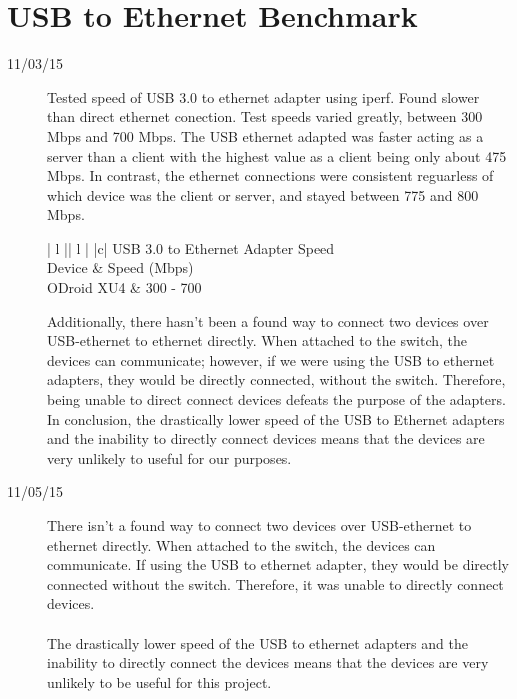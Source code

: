 \section{USB to Ethernet Benchmark}
\begin{description}
\item [11/03/15] Tested speed of USB 3.0 to ethernet adapter using iperf. Found slower than direct ethernet conection. Test speeds varied greatly, between 300 Mbps and 700 Mbps. The USB ethernet adapted was faster acting as a server than a client with the highest value as a client being only about 475 Mbps. In contrast, the ethernet connections were consistent reguarless of which device was the client or server, and stayed between 775 and 800 Mbps. 

\begin{center}
\begin{tabular}{ | l || l | }
\hline
{}
{ |c| }{ USB 3.0 to Ethernet Adapter Speed } \\
\hline
Device & Speed (Mbps) \\
\hline
ODroid XU4 & 300 - 700 \\
\hline
\end{tabular}
\end{center}

Additionally, there hasn't been a found way to connect two devices over USB-ethernet to ethernet directly. When attached to the switch, the devices can communicate; however, if we were using the USB to ethernet adapters, they would be directly connected, without the switch. Therefore, being unable to direct connect devices defeats the purpose of the adapters. In conclusion, the drastically lower speed of the USB to Ethernet adapters and the inability to directly connect devices means that the devices are very unlikely to useful for our purposes. \\

\item [11/05/15] There isn't a found way to connect two devices over USB-ethernet to ethernet directly. When attached to the switch, the devices can communicate. If using the USB to ethernet adapter, they would be directly connected without the switch. Therefore, it was unable to directly connect devices. \\ \\
The drastically lower speed of the USB to ethernet adapters and the inability to directly connect the devices means that the devices are very unlikely to be useful for this project.
\end{description}

